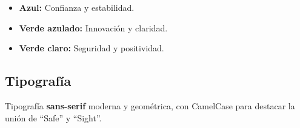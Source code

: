 \begin{itemize}
\item \textbf{Azul:} Confianza y estabilidad.
\item \textbf{Verde azulado:} Innovación y claridad.
\item \textbf{Verde claro:} Seguridad y positividad.
\end{itemize}

\subsection*{Tipografía}

Tipografía \textbf{sans-serif} moderna y geométrica, con CamelCase para destacar la unión de ``Safe'' y ``Sight''.

